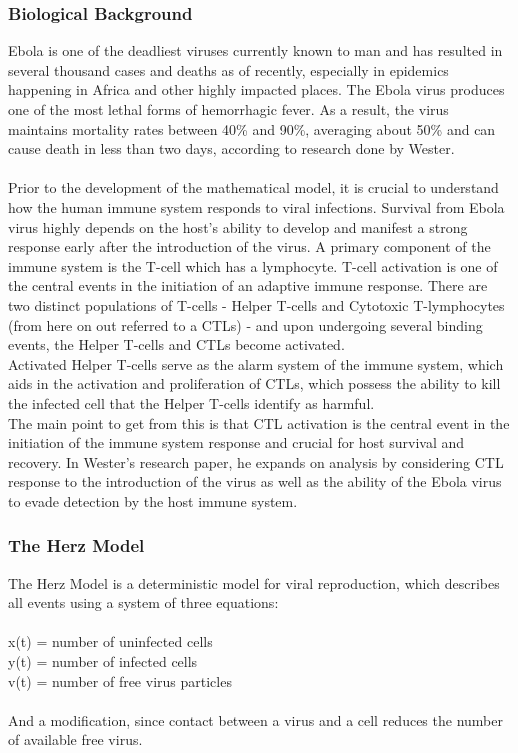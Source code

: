 \documentclass{article}
\begin{document}
\subsubsection{Biological Background}
Ebola is one of the deadliest viruses currently known to man and has resulted in several thousand cases and deaths as of recently, especially in epidemics happening in Africa and other highly impacted places. The Ebola virus produces one of the most lethal forms of hemorrhagic fever. As a result, the virus maintains mortality rates between 40\% and 90\%, averaging about 50\% and can cause death in less than two days, according to research done by Wester.\\
\\
Prior to the development of the mathematical model, it is crucial to understand how the human immune system responds to viral infections. Survival from Ebola virus highly depends on the host's ability to develop and manifest a strong response early after the introduction of the virus. A primary component of the immune system is the T-cell which has a lymphocyte. T-cell activation is one of the central events in the initiation of an adaptive immune response. There are two distinct populations of T-cells - Helper T-cells and Cytotoxic T-lymphocytes (from here on out referred to a CTLs) - and upon undergoing several binding events, the Helper T-cells and CTLs become activated.\\
Activated Helper T-cells serve as the alarm system of the immune system, which aids in the activation and proliferation of CTLs, which possess the ability to kill the infected cell that the Helper T-cells identify as harmful.\\
The main point to get from this is that CTL activation is the central event in the initiation of the immune system response and crucial for host survival and recovery. In Wester's research paper, he expands on analysis by considering CTL response to the introduction of the virus as well as the ability of the Ebola virus to evade detection by the host immune system.

\subsubsection{The Herz Model}
The Herz Model is a deterministic model for viral reproduction, which describes all events using a system of three equations:\\
\\
	x(t) = number of uninfected cells\\
	y(t) = number of infected cells\\
	v(t) = number of free virus particles\\
\\
And a modification, since contact between a virus and a cell reduces the number of available free virus.
\end{document}
